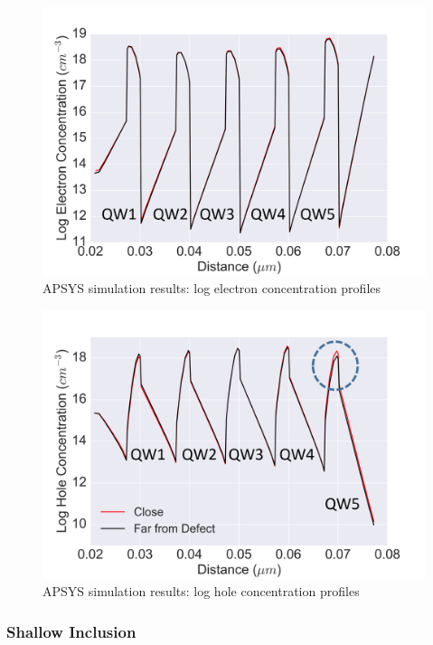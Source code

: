 \begin{figure}[h]
	\centering
	\includegraphics[width=1\textwidth]{Figs/Ch3/5A_elec.png}
	\caption[h] {APSYS simulation results: log electron concentration profiles }
	\label{deep-elec}
\end{figure}
\FloatBarrier  

\begin{figure}[h]
	\centering
	\includegraphics[width=1\textwidth]{Figs/Ch3/5A_hole.png}
	\caption[h] {APSYS simulation results: log hole concentration profiles}
	\label{deep-hole}
\end{figure}
\FloatBarrier  

\subsubsection{Shallow Inclusion}

